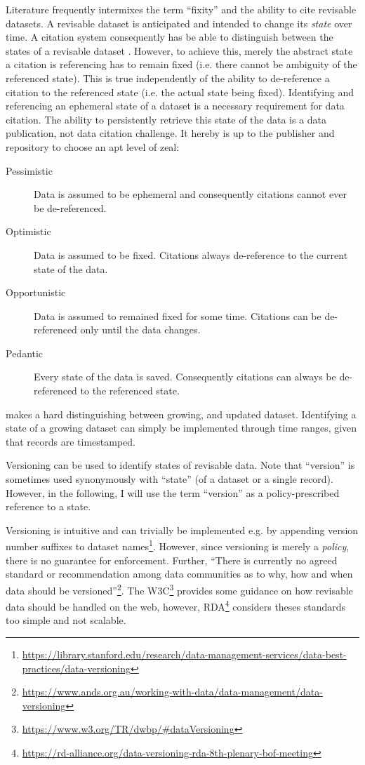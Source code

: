 \documentclass[a4paper,10pt]{article}
\begin{document}
Literature frequently intermixes the term ``fixity'' and the ability to cite revisable datasets. A revisable dataset is anticipated and intended to change its \textit{state} over time. A citation system consequently has be able to distinguish between the states of a revisable dataset \citep{Rauber2015, Klump2016}. However, to achieve this, merely the abstract state a citation is referencing has to remain fixed (i.e. there cannot be ambiguity of the referenced state).
This is true independently of the ability to de-reference a citation to the referenced state (i.e. the actual state being fixed). Identifying and referencing an ephemeral state of a dataset is a necessary requirement for data citation. The ability to persistently retrieve this state of the data is a data publication, not data citation challenge. It hereby is up to the publisher and repository to choose an apt level of zeal:

\begin{description}
  \item[Pessimistic] Data is assumed to be ephemeral and consequently citations cannot ever be de-referenced.
  \item[Optimistic] Data is assumed to be fixed. Citations always de-reference to the current state of the data.
  \item[Opportunistic] Data is assumed to remained fixed for some time. Citations can be de-referenced only until the data changes.
  \item[Pedantic] Every state of the data is saved. Consequently citations can always be de-referenced to the referenced state.  
\end{description}

\citep{Klump2016} makes a hard distinguishing between growing, and updated dataset. Identifying a state of a growing dataset can simply be implemented through time ranges, given that records are timestamped. 

Versioning can be used to identify states of revisable data. Note that ``version'' is sometimes used synonymously with ``state'' (of a dataset or a single record). However, in the following, I will use the term ``version'' as a policy-prescribed reference to a state.

Versioning is intuitive and can trivially be implemented e.g. by appending version number suffixes to dataset names\footnote{\url{https://library.stanford.edu/research/data-management-services/data-best-practices/data-versioning}}. 
However, since versioning is merely a \textit{policy}, there is no guarantee for enforcement. Further, ``There is currently no agreed standard or recommendation among data communities as to why, how and when data should be versioned''\footnote{\url{https://www.ands.org.au/working-with-data/data-management/data-versioning}}.
The W3C\footnote{\url{https://www.w3.org/TR/dwbp/\#dataVersioning}} provides some guidance on how revisable data should be handled on the web, however, \gls{RDA}\footnote{\url{https://rd-alliance.org/data-versioning-rda-8th-plenary-bof-meeting}} considers theses standards too simple and not scalable.
\end{document}
